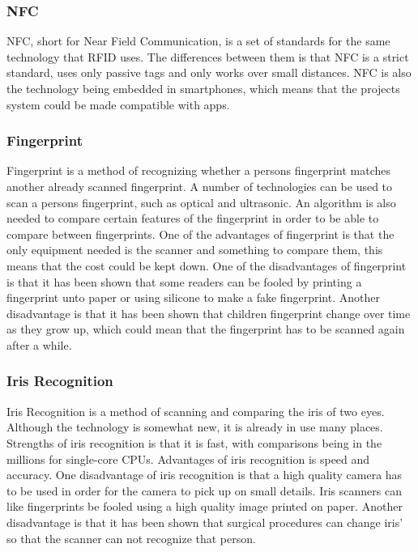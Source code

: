 \subsubsection{NFC}
NFC, short for Near Field Communication, is a set of standards for the same technology that RFID uses. The differences between them is that NFC is a strict standard, uses only passive tags and only works over small distances. NFC is also the technology being embedded in smartphones, which means that the projects system could be made compatible with apps.

\subsubsection{Fingerprint}
Fingerprint is a method of recognizing whether a persons fingerprint matches another already scanned fingerprint. A number of technologies can be used to scan a persons fingerprint, such as optical and ultrasonic. An algorithm is also needed to compare certain features of the fingerprint in order to be able to compare between fingerprints. One of the advantages of fingerprint is that the only equipment needed is the scanner and something to compare them, this means that the cost could be kept down. One of the disadvantages of fingerprint is that it has been shown that some readers can be fooled by printing a fingerprint unto paper or using silicone to make a fake fingerprint. Another disadvantage is that it has been shown that children fingerprint change over time as they grow up, which could mean that the fingerprint has to be scanned again after a while.

\subsubsection{Iris Recognition}
Iris Recognition is a method of scanning and comparing the iris of two eyes. Although the technology is somewhat new, it is already in use many places. Strengths of iris recognition is that it is fast, with comparisons being in the millions for single-core CPUs. Advantages of iris recognition is speed and accuracy. One disadvantage of iris recognition is that a high quality camera has to be used in order for the camera to pick up on small details. Iris scanners can like fingerprints be fooled using a high quality image printed on paper. Another disadvantage is that it has been shown that surgical procedures can change iris' so that the scanner can not recognize that person.

